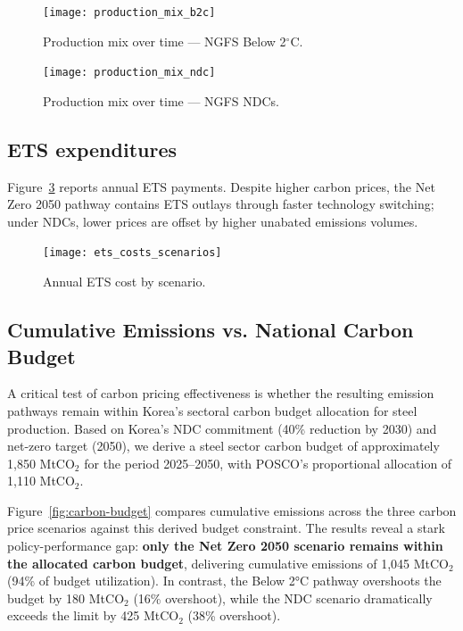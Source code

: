 \documentclass[preprint,5p,authoryear]{elsarticle}
\begin{document}
\begin{figure}[!t]
  \centering
  \texttt{[image: production\_mix\_b2c]}
  \caption{Production mix over time --- NGFS Below 2$^\circ$C.}
  \label{fig:mix-b2c}
\end{figure}

\begin{figure}[!t]
  \centering
  \texttt{[image: production\_mix\_ndc]}
  \caption{Production mix over time --- NGFS NDCs.}
  \label{fig:mix-ndc}
\end{figure}

\subsection{ETS expenditures}
Figure~\ref{fig:ets-scenarios} reports annual ETS payments. Despite higher carbon prices, the Net Zero 2050 pathway contains ETS outlays through faster technology switching; under NDCs, lower prices are offset by higher unabated emissions volumes.

\begin{figure}[!t]
  \centering
  \texttt{[image: ets\_costs\_scenarios]}
  \caption{Annual ETS cost by scenario.}
  \label{fig:ets-scenarios}
\end{figure}

\subsection{Cumulative Emissions vs. National Carbon Budget}

A critical test of carbon pricing effectiveness is whether the resulting emission pathways remain within Korea's sectoral carbon budget allocation for steel production. Based on Korea's NDC commitment (40\% reduction by 2030) and net-zero target (2050), we derive a steel sector carbon budget of approximately 1,850 MtCO$_2$ for the period 2025--2050, with POSCO's proportional allocation of 1,110 MtCO$_2$.

Figure~\ref{fig:carbon-budget} compares cumulative emissions across the three carbon price scenarios against this derived budget constraint. The results reveal a stark policy-performance gap: \textbf{only the Net Zero 2050 scenario remains within the allocated carbon budget}, delivering cumulative emissions of 1,045 MtCO$_2$ (94\% of budget utilization). In contrast, the Below 2°C pathway overshoots the budget by 180 MtCO$_2$ (16\% overshoot), while the NDC scenario dramatically exceeds the limit by 425 MtCO$_2$ (38\% overshoot).
\end{document}

